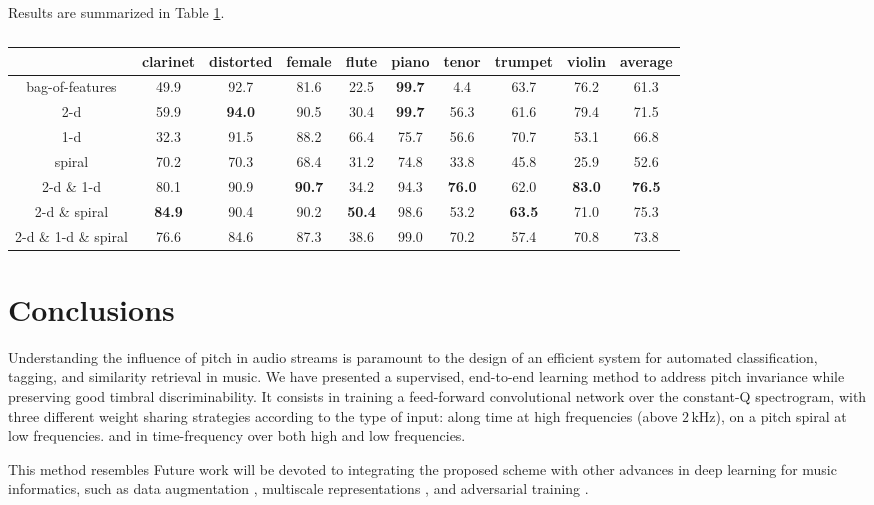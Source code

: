 \documentclass{article}
\begin{document}
Results are summarized in Table \ref{table:results}.

\begin{table}[t]
	\begin{center}
	\setlength{\unitlength}{1cm}
	\begin{tabular}{|c|cccccccc|c|}
		\hline
		& clarinet & distorted & female & flute & piano & tenor & trumpet & violin & average \\
		\hline
		bag-of-features
		& 49.9 & 92.7 & 81.6 & 22.5 & \textbf{99.7} & \hphantom{0}4.4 & 63.7 & 76.2 & 61.3 \\
		\hline
		
		2-d
		& 59.9 & \textbf{94.0} & 90.5 & 30.4 & \textbf{99.7} & 56.3 & 61.6 & 79.4 & 71.5 \\
		1-d
		& 32.3 & 91.5 & 88.2 & 66.4 & 75.7 & 56.6 & 70.7 & 53.1 & 66.8 \\
		spiral
		& 70.2 & 70.3 & 68.4 & 31.2 & 74.8 & 33.8 & 45.8 & 25.9 & 52.6 \\
		\hline
		2-d \& 1-d
		& 80.1 & 90.9 & \textbf{90.7} & 34.2 & 94.3 & \textbf{76.0} & 62.0 & \textbf{83.0} & \textbf{76.5} \\
		2-d \& spiral
		& \textbf{84.9} & 90.4 & 90.2 & \textbf{50.4} & 98.6 & 53.2 & \textbf{63.5} & 71.0 & 75.3\\
		\hline
		2-d \& 1-d \& spiral
		& 76.6 & 84.6 & 87.3 & 38.6 & 99.0 & 70.2 & 57.4 & 70.8 & 73.8  \\
		\hline
	\end{tabular}
	\end{center}
	\caption{\label{table:results}}
\end{table}


\section{Conclusions}
Understanding the influence of pitch in audio streams is paramount to the design of
an efficient system for automated classification, tagging, and similarity retrieval in music. 
We have presented a supervised, end-to-end learning method to address pitch invariance
while preserving good timbral discriminability.
It consists in training a feed-forward convolutional network over the constant-Q spectrogram,
with three different weight sharing strategies according to the type of input:
along time at high frequencies (above $2\,\mathrm{kHz}$), on a pitch spiral at low frequencies.
and in time-frequency over both high and low frequencies.

This method resembles \cite{Dieleman2011} \cite{Durand2016}
Future work will be devoted to integrating the proposed scheme with other advances
in deep learning for music informatics, such as data augmentation \cite{McFee2015-muda},
multiscale representations \cite{Hamel2012, Anden2015},
and adversarial training \cite{Kereliuk2015}.

\clearpage

\end{document}
